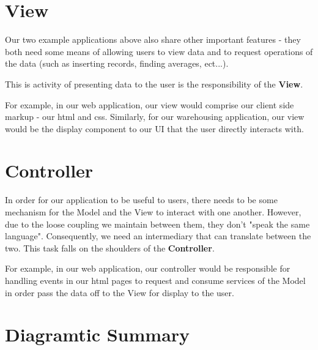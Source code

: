 \section{View}

Our two example applications above also share other important features - they both need some means of allowing users to view data and to request operations of the data (such as inserting records, finding averages, ect...). 

This is activity of presenting data to the user is the responsibility of the \textbf{View}. 

For example, in our web application, our view would comprise our client side markup - our html and css. Similarly, for our warehousing application, our view would be the display component to our UI that the user directly interacts with.

\section{Controller}

In order for our application to be useful to users, there needs to be some mechanism for the Model and the View to interact with one another. However, due to the loose coupling we maintain between them, they don't "speak the same language". Consequently, we need an intermediary that can translate between the two. This task falls on the shoulders of the \textbf{Controller}.


For example, in our web application, our controller would be responsible for handling events in our html pages to request and consume services of the Model in order pass the data off to the View for display to the user.

\section{Diagramtic Summary}

\begin{center}



\end{center}





